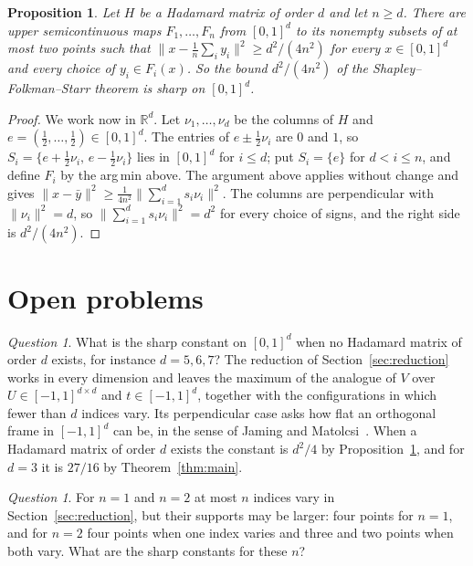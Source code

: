 \documentclass[11pt]{amsart}
\newtheorem{prop}[thm]{Proposition}
\theoremstyle{remark}
\newtheorem{question}[thm]{Question}
\numberwithin{equation}{section}
\begin{document}
\begin{prop}\label{prop:hadamard}
Let $H$ be a Hadamard matrix of order $d$ and let $n\ge d$. There are upper semicontinuous maps $F_1,\dots,F_n$ from $[0,1]^d$ to its nonempty subsets of at most two points such that $\|x-\frac1n\sum_iy_i\|^2\ge d^2/(4n^2)$ for every $x\in[0,1]^d$ and every choice of $y_i\in F_i(x)$. So the bound $d^2/(4n^2)$ of the Shapley--Folkman--Starr theorem is sharp on $[0,1]^d$.
\end{prop}

\begin{proof}
We work now in $\mathbb R^d$. Let $\nu_1,\dots,\nu_d$ be the columns of $H$ and $e=(\frac12,\dots,\frac12)\in[0,1]^d$. The entries of $e\pm\frac12\nu_i$ are $0$ and $1$, so $S_i=\{e+\frac12\nu_i,\,e-\frac12\nu_i\}$ lies in $[0,1]^d$ for $i\le d$; put $S_i=\{e\}$ for $d<i\le n$, and define $F_i$ by the arg\,min above. The argument above applies without change and gives $\|x-\bar y\|^2\ge\frac1{4n^2}\|\sum_{i=1}^ds_i\nu_i\|^2$. The columns are perpendicular with $\|\nu_i\|^2=d$, so $\|\sum_{i=1}^ds_i\nu_i\|^2=d^2$ for every choice of signs, and the right side is $d^2/(4n^2)$.
\end{proof}

\section{Open problems}\label{sec:open}

\begin{question}
What is the sharp constant on $[0,1]^d$ when no Hadamard matrix of order $d$ exists, for instance $d=5,6,7$? The reduction of Section~\ref{sec:reduction} works in every dimension and leaves the maximum of the analogue of $V$ over $U\in[-1,1]^{d\times d}$ and $t\in[-1,1]^d$, together with the configurations in which fewer than $d$ indices vary. Its perpendicular case asks how flat an orthogonal frame in $[-1,1]^d$ can be, in the sense of Jaming and Matolcsi~\cite{JamingMatolcsi}. When a Hadamard matrix of order $d$ exists the constant is $d^2/4$ by Proposition~\ref{prop:hadamard}, and for $d=3$ it is $27/16$ by Theorem~\ref{thm:main}.
\end{question}

\begin{question}
For $n=1$ and $n=2$ at most $n$ indices vary in Section~\ref{sec:reduction}, but their supports may be larger: four points for $n=1$, and for $n=2$ four points when one index varies and three and two points when both vary. What are the sharp constants for these $n$?
\end{question}
\end{document}
